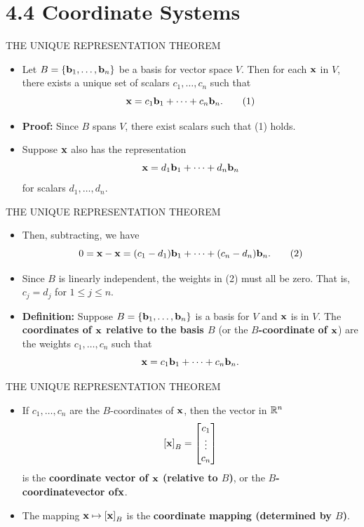 \section[4.4 Coordinate Systems]{4.4 Coordinate Systems}

\begin{frame}[shrink=7]{THE UNIQUE REPRESENTATION THEOREM}
\begin{itemize}
\item {} Let $B=\{\mathbf{b}_1,\ldots,\mathbf{b}_n\}$ be a basis for vector space $V$. Then for each $\mathbf{x}$ in $V$, there exists a unique set of scalars $c_1,\ldots,c_n$ such that
\begin{equation}
\mathbf{x}=c_1\mathbf{b}_1+\cdots+c_n\mathbf{b}_n. \tag{1}
\end{equation}
\item \textbf{Proof:} Since $B$ spans $V$, there exist scalars such that (1) holds.
\item Suppose $\mathbf{x}$ also has the representation
\[
\mathbf{x}=d_1\mathbf{b}_1+\cdots+d_n\mathbf{b}_n
\]
for scalars $d_1,\ldots,d_n$.
\end{itemize}
\end{frame}

\begin{frame}[shrink=9]{THE UNIQUE REPRESENTATION THEOREM}
\begin{itemize}
\item Then, subtracting, we have
\begin{equation}
0=\mathbf{x}-\mathbf{x}=(c_1-d_1)\mathbf{b}_1+\cdots+(c_n-d_n)\mathbf{b}_n. \tag{2}
\end{equation}
\item Since $B$ is linearly independent, the weights in (2) must all be zero. That is, $c_j=d_j$ for $1\leq j\leq n$.
\item \textbf{Definition:} Suppose $B=\{\mathbf{b}_1,\ldots,\mathbf{b}_n\}$ is a basis for $V$ and $\mathbf{x}$ is in $V$. The \textbf{coordinates of $\mathbf{x}$ relative to the basis $B$} (or the \textbf{$B$-coordinate of $\mathbf{x}$}) are the weights $c_1,\ldots,c_n$ such that
\[
\mathbf{x}=c_1\mathbf{b}_1+\cdots+c_n\mathbf{b}_n.
\]
\end{itemize}
\end{frame}

\begin{frame}[shrink=7]{THE UNIQUE REPRESENTATION THEOREM}
\begin{itemize}
\item If $c_1,\ldots,c_n$ are the $B$-coordinates of $\mathbf{x}$, then the vector in $\mathbb{R}^n$
\[
\left[\mathbf{x}\right]_{B}=\begin{bmatrix}c_1\\ \vdots\\ c_n\end{bmatrix}
\]
is the \textbf{coordinate vector of $\mathbf{x}$ (relative to $B$)}, or the \textbf{$B$-coordinatevector of$\mathbf{x}$}.
\item The mapping $\mathbf{x}\mapsto\left[\mathbf{x}\right]_{B}$ is the \textbf{coordinate mapping (determined by $B$)}.
\end{itemize}
\end{frame}

